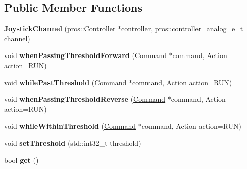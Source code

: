 \subsection*{Public Member Functions}
\begin{DoxyCompactItemize}
\item 
\mbox{\label{classlib_iterative_robot_1_1_joystick_channel_a75bf0fa44f1d1b06c263b42140d31bbe}} 
{\bfseries Joystick\+Channel} (pros\+::\+Controller $\ast$controller, pros\+::controller\+\_\+analog\+\_\+e\+\_\+t channel)
\item 
\mbox{\label{classlib_iterative_robot_1_1_joystick_channel_ac45df12e95ae01ca0fa73f5146654628}} 
void {\bfseries when\+Passing\+Threshold\+Forward} (\mbox{\hyperlink{classlib_iterative_robot_1_1_command}{Command}} $\ast$command, Action action=R\+UN)
\item 
\mbox{\label{classlib_iterative_robot_1_1_joystick_channel_af6066fde3b237e60862ea2ceabf567c2}} 
void {\bfseries while\+Past\+Threshold} (\mbox{\hyperlink{classlib_iterative_robot_1_1_command}{Command}} $\ast$command, Action action=R\+UN)
\item 
\mbox{\label{classlib_iterative_robot_1_1_joystick_channel_a95c45499510507aa6b9d83d3864b6f16}} 
void {\bfseries when\+Passing\+Threshold\+Reverse} (\mbox{\hyperlink{classlib_iterative_robot_1_1_command}{Command}} $\ast$command, Action action=R\+UN)
\item 
\mbox{\label{classlib_iterative_robot_1_1_joystick_channel_ae8187eb9d1857b143292e97cff6f65a5}} 
void {\bfseries while\+Within\+Threshold} (\mbox{\hyperlink{classlib_iterative_robot_1_1_command}{Command}} $\ast$command, Action action=R\+UN)
\item 
\mbox{\label{classlib_iterative_robot_1_1_joystick_channel_a5177f15ef0ffef2e47b14633163d438f}} 
void {\bfseries set\+Threshold} (std\+::int32\+\_\+t threshold)
\item 
\mbox{\label{classlib_iterative_robot_1_1_joystick_channel_aa6a9a38616b4b35428145d494ea52554}} 
bool {\bfseries get} ()
\end{DoxyCompactItemize}
